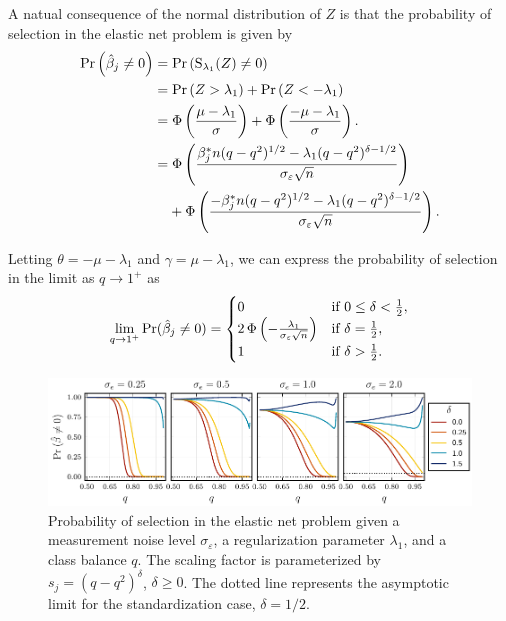 A natual consequence of the normal distribution of \(Z\) is that the probability of selection in the elastic net problem is given by
\begin{align*}
  \Pr\left(\hat{\beta}_j \neq 0\right) & = \Pr\left(\st_{\lambda_1}(Z) \neq 0\right)                                                                                         \\
                                       & = \Pr\left(Z > \lambda_1\right) + \Pr\left(Z < -\lambda_1\right)                                                                    \\
                                       & = \cdf\left(\frac{\mu - \lambda_1}{\sigma}\right) + \cdf\left(\frac{- \mu -\lambda_1}{\sigma}\right).                               \\
                                       & = \cdf \left( \frac{\beta_j^*n (q-q^2)^{1/2} - \lambda_1(q-q^2)^{\delta - 1/2}}{\sigma_\varepsilon \sqrt{n}}\right)                 \\
                                       & \phantom{={}} + \cdf \left( \frac{-\beta_j^*n (q-q^2)^{1/2} - \lambda_1(q-q^2)^{\delta - 1/2}}{\sigma_\varepsilon \sqrt{n}}\right).
\end{align*}

Letting \(\theta = -\mu - \lambda_1 \) and \(\gamma = \mu - \lambda_1\), we can express the probability of selection in the limit as \(q \rightarrow 1^+\) as
\[
  \lim_{q \rightarrow 1^+} \Pr(\hat{\beta}_j \neq 0) =
  \begin{cases}
    0                                                                & \text{if } 0 \leq \delta < \frac{1}{2}, \\
    2\operatorname{\Phi}\left(-\frac{\lambda_1}{\sigma_\varepsilon \sqrt{n}}\right) & \text{if } \delta = \frac{1}{2},        \\
    1                                                                & \text{if } \delta > \frac{1}{2}.
  \end{cases}
\]

\begin{figure}[htpb]
  \centering
  \includegraphics[]{plots/selection_probability.pdf}
  \caption{%
    Probability of selection in the elastic net problem given a measurement noise level \(\sigma_\varepsilon\), a regularization parameter \(\lambda_1\), and a class balance \(q\). The scaling factor is parameterized by \(s_j = (q - q^2)^\delta\), \(\delta \geq 0\). The dotted line represents the asymptotic limit for the standardization case, \(\delta = 1/2\). }
  \label{fig:selection-probability}
\end{figure}

